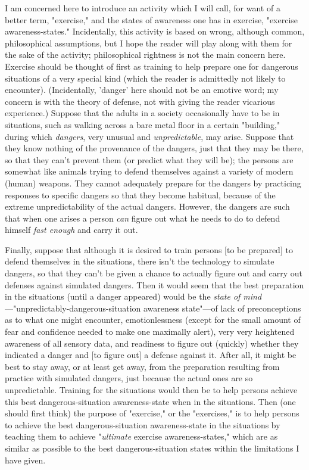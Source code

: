 I am concerned here to introduce an activity which I will call, for want of 
a better term, "exercise," and the states of awareness one has in exercise, 
"exercise awareness-states." Incidentally, this activity is based on wrong, 
although common, philosophical assumptions, but I hope the reader will play 
along with them for the sake of the activity; philosophical rightness is not 
the main concern here. Exercise should be thought of first as training to help 
prepare one for dangerous situations of a very special kind (which the 
reader is admittedly not likely to encounter). (Incidentally, 'danger' here 
should not be an emotive word; my concern is with the theory of defense, 
not with giving the reader vicarious experience.) Suppose that the adults in 
a society occasionally have to be in situations, such as walking across a 
bare metal floor in a certain "building," during which \emph{dangers}, very unusual 
and \emph{unpredictable}, may arise. Suppose that they know nothing of the 
provenance of the dangers, just that they may be there, so that they can't 
prevent them (or predict what they will be); the persons are somewhat like 
animals trying to defend themselves against a variety of modern (human) 
weapons. They cannot adequately prepare for the dangers by practicing 
responses to specific dangers so that they become habitual, because of the 
extreme unpredictability of the actual dangers. However, the dangers are 
such that when one arises a person \emph{can} figure out what he needs to do to 
defend himself \emph{fast enough} and carry it out. 

Finally, suppose that although it is desired to train persons [to be prepared] 
to defend themselves in the situations, there isn't the technology to simulate 
dangers, so that they can't be given a chance to actually figure out and carry 
out defenses against simulated dangers. Then it would seem that the best 
preparation in the situations (until a danger appeared) would be the \emph{state 
of mind}---"unpredictably-dangerous-situation awareness state"---of lack of 
preconceptions as to what one might encounter, emotionlessness (except 
for the small amount of fear and confidence needed to make one maximally 
alert), very very heightened awareness of all sensory data, and readiness 
to figure out (quickly) whether they indicated a danger and [to figure out] a 
defense against it. After all, it might be best to stay away, or at least get 
away, from the preparation resulting from practice with simulated dangers, 
just because the actual ones are so unpredictable. Training for the situations 
would then be to help persons achieve this best dangerous-situation 
awareness-state when in the situations. Then (one should first think) the purpose 
of "exercise," or the "exercises," is to help persons to achieve the best 
dangerous-situation awareness-state in the situations by teaching them to 
achieve "\emph{ultimate} exercise awareness-states," which are as similar as 
possible to the best dangerous-situation states within the limitations I have 
given. 

